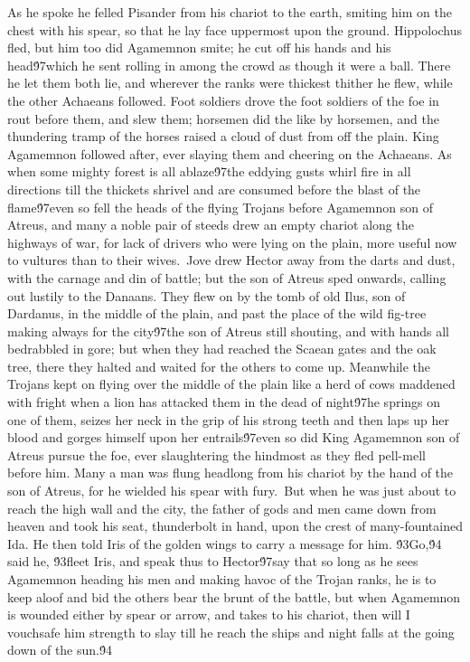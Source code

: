 {As he spoke he felled Pisander from his chariot to the earth, smiting him on the chest with his spear, so that he lay face uppermost upon the ground. Hippolochus fled, but him too did Agamemnon smite; he cut off his hands and his head\'97which he sent rolling in among the crowd as though it were a ball. There he let them both lie, and wherever the ranks were thickest thither he flew, while the other Achaeans followed. Foot soldiers drove the foot soldiers of the foe in rout before them, and slew them; horsemen did the like by horsemen, and the thundering tramp of the horses raised a cloud of dust from off the plain. King Agamemnon followed after, ever slaying them and cheering on the Achaeans. As when some mighty forest is all ablaze\'97the eddying gusts whirl fire in all directions till the thickets shrivel and are consumed before the blast of the flame\'97even so fell the heads of the flying Trojans before Agamemnon son of Atreus, and many a noble pair of steeds drew an empty chariot along the highways of war, for lack of drivers who were lying on the plain, more useful now to vultures than to their wives.\
Jove drew Hector away from the darts and dust, with the carnage and din of battle; but the son of Atreus sped onwards, calling out lustily to the Danaans. They flew on by the tomb of old Ilus, son of Dardanus, in the middle of the plain, and past the place of the wild fig-tree making always for the city\'97the son of Atreus still shouting, and with hands all bedrabbled in gore; but when they had reached the Scaean gates and the oak tree, there they halted and waited for the others to come up. Meanwhile the Trojans kept on flying over the middle of the plain like a herd of cows maddened with fright when a lion has attacked them in the dead of night\'97he springs on one of them, seizes her neck in the grip of his strong teeth and then laps up her blood and gorges himself upon her entrails\'97even so did King Agamemnon son of Atreus pursue the foe, ever slaughtering the hindmost as they fled pell-mell before him. Many a man was flung headlong from his chariot by the hand of the son of Atreus, for he wielded his spear with fury.\
But when he was just about to reach the high wall and the city, the father of gods and men came down from heaven and took his seat, thunderbolt in hand, upon the crest of many-fountained Ida. He then told Iris of the golden wings to carry a message for him. \'93Go,\'94 said he, \'93fleet Iris, and speak thus to Hector\'97say that so long as he sees Agamemnon heading his men and making havoc of the Trojan ranks, he is to keep aloof and bid the others bear the brunt of the battle, but when Agamemnon is wounded either by spear or arrow, and takes to his chariot, then will I vouchsafe him strength to slay till he reach the ships and night falls at the going down of the sun.\'94\
}
